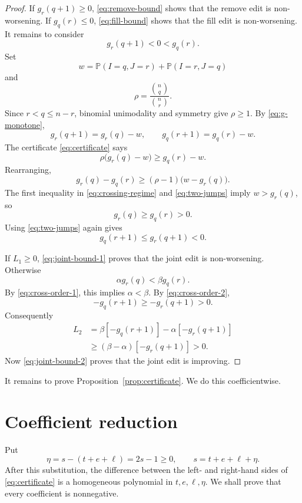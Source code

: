 \documentclass[11pt]{article}
\newcommand{\PP}{\mathbb P}
\newcommand{\1}{\mathbf 1}
\begin{document}
\begin{proof}
If $g_r(q+1)\geq0$, \eqref{eq:remove-bound} shows that the remove edit
is non-worsening.  If $g_q(r)\leq0$, \eqref{eq:fill-bound} shows that
the fill edit is non-worsening.  It remains to consider
\begin{equation}\label{eq:crossing-regime}
g_r(q+1)<0<g_q(r).
\end{equation}
Set
\[
w=\PP(I=q,J=r)+\PP(I=r,J=q)
\]
and
\[
\rho=\frac{\binom nq}{\binom nr}.
\]
Since $r<q\leq n-r$, binomial unimodality and symmetry give
$\rho\geq1$.  By \eqref{eq:g-monotone},
\begin{equation}\label{eq:two-jumps}
g_r(q+1)=g_r(q)-w,
\qquad
g_q(r+1)=g_q(r)-w.
\end{equation}
The certificate \eqref{eq:certificate} says
\[
\rho\bigl(g_r(q)-w\bigr)\geq g_q(r)-w.
\]
Rearranging,
\[
g_r(q)-g_q(r)
\geq
(\rho-1)\bigl(w-g_r(q)\bigr).
\]
The first inequality in \eqref{eq:crossing-regime} and
\eqref{eq:two-jumps} imply $w>g_r(q)$, so
\begin{equation}\label{eq:cross-order-1}
g_r(q)\geq g_q(r)>0.
\end{equation}
Using \eqref{eq:two-jumps} again gives
\begin{equation}\label{eq:cross-order-2}
g_q(r+1)\leq g_r(q+1)<0.
\end{equation}

If $L_1\geq0$, \eqref{eq:joint-bound-1} proves that the joint edit is
non-worsening.  Otherwise
\[
\alpha g_r(q)<\beta g_q(r).
\]
By \eqref{eq:cross-order-1}, this implies $\alpha<\beta$.  By
\eqref{eq:cross-order-2},
\[
-g_q(r+1)\geq-g_r(q+1)>0.
\]
Consequently
\[
\begin{aligned}
L_2
&=\beta[-g_q(r+1)]-\alpha[-g_r(q+1)]\\
&\geq(\beta-\alpha)[-g_r(q+1)]>0.
\end{aligned}
\]
Now \eqref{eq:joint-bound-2} proves that the joint edit is improving.
\end{proof}

It remains to prove Proposition~\ref{prop:certificate}.  We do this
coefficientwise.

\section{Coefficient reduction}

Put
\begin{equation}\label{eq:eta-substitution}
\eta=s-(t+e+\ell)=2s-1\geq0,
\qquad
s=t+e+\ell+\eta.
\end{equation}
After this substitution, the difference between the left- and
right-hand sides of \eqref{eq:certificate} is a homogeneous polynomial
in $t,e,\ell,\eta$.  We shall prove that every coefficient is
nonnegative.
\end{document}
